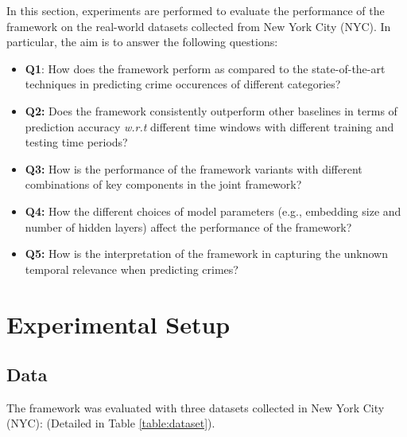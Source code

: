 In this section, experiments are performed to evaluate the performance
of the framework on the real-world datasets collected from New York
City (NYC). In particular, the aim is to answer the following questions:
\begin{itemize}
    \item \textbf{Q1}: How does the framework perform as compared to the state-of-the-art techniques in predicting crime occurences of different categories?
    \item \textbf{Q2:}  Does the framework consistently outperform other baselines in terms of prediction accuracy \emph{w.r.t} different time windows with different training and testing time periods?
    \item \textbf{Q3:} How is the performance of the framework variants with different combinations of key components in the joint framework?
    \item \textbf{Q4:} How the different choices of model parameters (e.g., embedding size and number of hidden layers) affect the performance of the framework?
    \item \textbf{Q5:} How is the interpretation of the framework in capturing the unknown temporal relevance when predicting crimes?
\end{itemize}

\section{Experimental Setup}
\subsection{Data}
The framework was evaluated with three datasets collected in New York City (NYC): (Detailed in Table \ref{table:dataset}).

